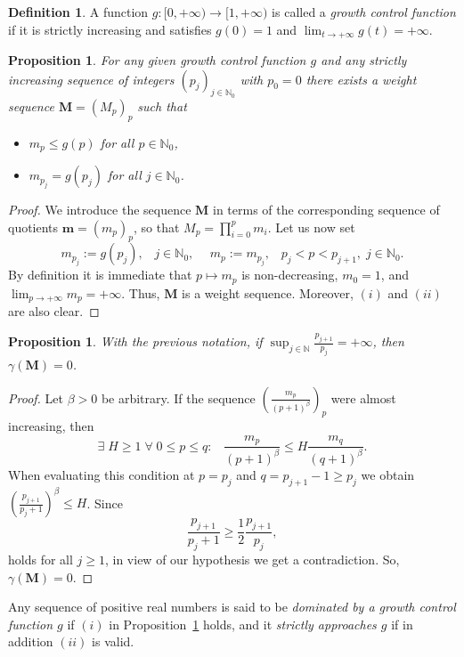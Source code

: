 \documentclass[12pt,a4paper]{article}
\newcommand{\N}{\mathbb{N}}
\newcommand{\M}{{\boldsymbol{M}}}
\newcommand{\m}{{\boldsymbol{m}}}
\theoremstyle{plain}
\newtheorem{proposition}[theorem]{Proposition}
\theoremstyle{definition}
\newtheorem{definition}[theorem]{Definition}
\numberwithin{equation}{section}
\begin{document}
\begin{definition}
A  function $g\colon[0,+\infty)\rightarrow[1,+\infty)$ is called a \emph{growth control function} if it is strictly increasing and satisfies $g(0)=1$ and $\lim_{t\rightarrow+\infty}g(t)=+\infty$.
\end{definition}

\begin{proposition}\label{growththm}
For any given growth control function $g$ and any strictly increasing sequence of integers  $(p_j)_{j\in\mathbb{N}_0}$ with $p_0=0$ there exists a weight sequence $\M=(M_p)_p$ such that
\begin{itemize}
\item[$(i)$] $m_p\le g(p)$ for all $p\in\mathbb{N}_0$,
\item[$(ii)$] $m_{p_j}=g(p_j)$ for all $j\in\N_0$.
\end{itemize}
\end{proposition}

\begin{proof}
We introduce the sequence $\M$ in terms of the corresponding sequence of quotients $\m=(m_p)_p$, so that $M_p=\prod_{i=0}^pm_i$.
Let us now set
$$m_{p_j}:=g(p_j),\;\;\;j\in\mathbb{N}_0,\hspace{15pt}m_p:=m_{p_j}, \;\;\;p_j<p<p_{j+1},\;j\in\mathbb{N}_0.$$
By definition it is immediate that $p\mapsto m_p$ is non-decreasing, $m_0=1$, and $\lim_{p\rightarrow+\infty}m_p=+\infty$. Thus, $\M$ is a weight sequence. Moreover, $(i)$ and $(ii)$ are also clear.
\end{proof}


\begin{proposition}\label{growththmGAMMA}
With the previous notation, if  $\sup_{j\in\mathbb{N}}\frac{p_{j+1}}{p_j}=+\infty$, then  $\gamma(\M)=0$.
\end{proposition}


\begin{proof}
Let $\beta>0$ be arbitrary. If the sequence $\left(\frac{m_p}{(p+1)^{\beta}}\right)_p$ were almost increasing, then
$$\exists\;H\ge 1\;\forall\;0\le p\le q:\;\;\;\frac{m_p}{(p+1)^{\beta}}\le H\frac{m_q}{(q+1)^{\beta}}.$$
When evaluating this condition at $p=p_j$ and $q=p_{j+1}-1\ge p_j$ we obtain $\left(\frac{p_{j+1}}{p_j+1}\right)^{\beta}\le H$. Since $$\frac{p_{j+1}}{p_j+1}\ge\frac{1}{2}\frac{p_{j+1}}{p_j},$$ holds for all $j\ge 1$, in view of our hypothesis we get a contradiction. So, $\gamma(\M)=0$.
\end{proof}

Any sequence of positive real numbers is said to be \emph{dominated by a growth control function $g$} if $(i)$ in Proposition~\ref{growththm} holds, and it \emph{strictly approaches $g$} if in addition $(ii)$ is valid.
\end{document}
